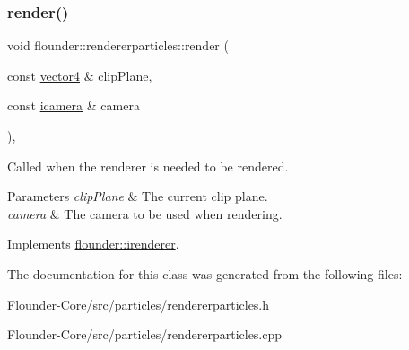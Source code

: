 \subsubsection{\texorpdfstring{render()}{render()}}
{\footnotesize\ttfamily void flounder\+::rendererparticles\+::render (\begin{DoxyParamCaption}\item[{const \hyperlink{classflounder_1_1vector4}{vector4} \&}]{clip\+Plane,  }\item[{const \hyperlink{classflounder_1_1icamera}{icamera} \&}]{camera }\end{DoxyParamCaption})\hspace{0.3cm}{\ttfamily [override]}, {\ttfamily [virtual]}}



Called when the renderer is needed to be rendered. 


\begin{DoxyParams}{Parameters}
{\em clip\+Plane} & The current clip plane. \\
\hline
{\em camera} & The camera to be used when rendering. \\
\hline
\end{DoxyParams}


Implements \hyperlink{classflounder_1_1irenderer_a3f355dc39e2680bf3f3441d3dfaaa010}{flounder\+::irenderer}.



The documentation for this class was generated from the following files\+:\begin{DoxyCompactItemize}
\item 
Flounder-\/\+Core/src/particles/rendererparticles.\+h\item 
Flounder-\/\+Core/src/particles/rendererparticles.\+cpp\end{DoxyCompactItemize}

